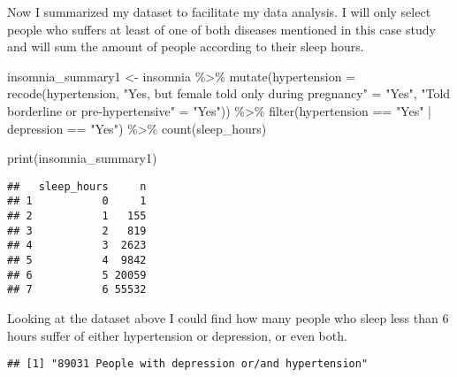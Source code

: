 \documentclass[
]{article}
\newenvironment{Shaded}{\begin{snugshade}}{\end{snugshade}}
\newcommand{\AttributeTok}[1]{\textcolor[rgb]{0.77,0.63,0.00}{#1}}
\newcommand{\FunctionTok}[1]{\textcolor[rgb]{0.00,0.00,0.00}{#1}}
\newcommand{\NormalTok}[1]{#1}
\newcommand{\OtherTok}[1]{\textcolor[rgb]{0.56,0.35,0.01}{#1}}
\newcommand{\SpecialCharTok}[1]{\textcolor[rgb]{0.00,0.00,0.00}{#1}}
\newcommand{\StringTok}[1]{\textcolor[rgb]{0.31,0.60,0.02}{#1}}
\begin{document}
Now I summarized my dataset to facilitate my data analysis. I will only
select people who suffers at least of one of both diseases mentioned in
this case study and will sum the amount of people according to their
sleep hours.

\begin{Shaded}
\begin{Highlighting}[]
\NormalTok{insomnia\_summary1 }\OtherTok{\textless{}{-}}\NormalTok{ insomnia }\SpecialCharTok{\%\textgreater{}\%} 
  \FunctionTok{mutate}\NormalTok{(}\AttributeTok{hypertension =} \FunctionTok{recode}\NormalTok{(hypertension,}
                               \StringTok{"Yes, but female told only during pregnancy"} \OtherTok{=} \StringTok{"Yes"}\NormalTok{,}
                               \StringTok{"Told borderline or pre{-}hypertensive"} \OtherTok{=} \StringTok{"Yes"}\NormalTok{)) }\SpecialCharTok{\%\textgreater{}\%} 
  \FunctionTok{filter}\NormalTok{(hypertension }\SpecialCharTok{==} \StringTok{"Yes"} \SpecialCharTok{|}\NormalTok{ depression }\SpecialCharTok{==} \StringTok{"Yes"}\NormalTok{) }\SpecialCharTok{\%\textgreater{}\%} 
  \FunctionTok{count}\NormalTok{(sleep\_hours)}

\FunctionTok{print}\NormalTok{(insomnia\_summary1)}
\end{Highlighting}
\end{Shaded}

\begin{verbatim}
##   sleep_hours     n
## 1           0     1
## 2           1   155
## 3           2   819
## 4           3  2623
## 5           4  9842
## 6           5 20059
## 7           6 55532
\end{verbatim}

Looking at the dataset above I could find how many people who sleep less
than 6 hours suffer of either hypertension or depression, or even both.

\begin{Shaded}
\end{Shaded}

\begin{verbatim}
## [1] "89031 People with depression or/and hypertension"
\end{verbatim}
\end{document}
